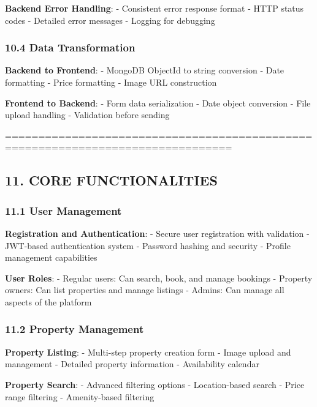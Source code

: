 \documentclass[12pt,a4paper]{article}
\begin{document}
\textbf{Backend Error Handling}: - Consistent error response format -
HTTP status codes - Detailed error messages - Logging for debugging

\hypertarget{data-transformation}{%
\subsubsection{10.4 Data Transformation}\label{data-transformation}}

\textbf{Backend to Frontend}: - MongoDB ObjectId to string conversion -
Date formatting - Price formatting - Image URL construction

\textbf{Frontend to Backend}: - Form data serialization - Date object
conversion - File upload handling - Validation before sending

================================================================================

\hypertarget{core-functionalities}{%
\subsection{11. CORE FUNCTIONALITIES}\label{core-functionalities}}

\hypertarget{user-management}{%
\subsubsection{11.1 User Management}\label{user-management}}

\textbf{Registration and Authentication}: - Secure user registration
with validation - JWT-based authentication system - Password hashing and
security - Profile management capabilities

\textbf{User Roles}: - Regular users: Can search, book, and manage
bookings - Property owners: Can list properties and manage listings -
Admins: Can manage all aspects of the platform

\hypertarget{property-management}{%
\subsubsection{11.2 Property Management}\label{property-management}}

\textbf{Property Listing}: - Multi-step property creation form - Image
upload and management - Detailed property information - Availability
calendar

\textbf{Property Search}: - Advanced filtering options - Location-based
search - Price range filtering - Amenity-based filtering
\end{document}
